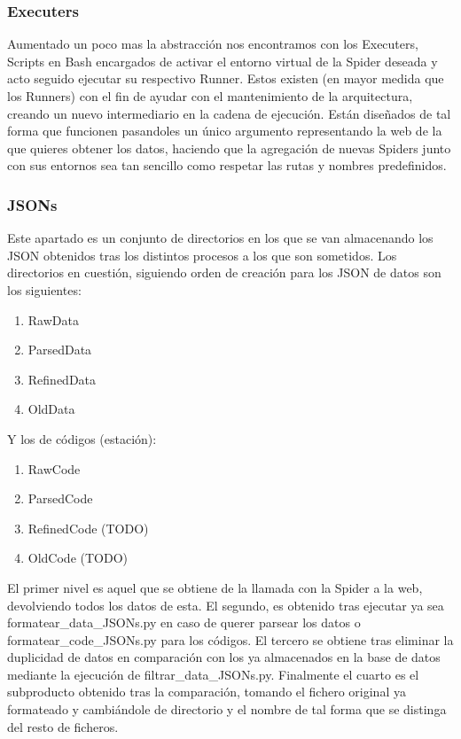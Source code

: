 \subsubsection{Executers}
Aumentado un poco mas la abstracción nos encontramos con los Executers, Scripts en Bash encargados de activar el entorno virtual de la Spider deseada y acto seguido ejecutar su respectivo Runner.\newline
\newline
Estos existen (en mayor medida que los Runners) con el fin de ayudar con el mantenimiento de la arquitectura, creando un nuevo intermediario en la cadena de ejecución.\newline
\newline
Están diseñados de tal forma que funcionen pasandoles un único argumento representando la web de la que quieres obtener los datos, haciendo que la agregación de nuevas Spiders junto con sus entornos sea tan sencillo como respetar las rutas y nombres predefinidos.

\subsubsection{JSONs}
Este apartado es un conjunto de directorios en los que se van almacenando los JSON obtenidos tras los distintos procesos a los que son sometidos.\newline
\newline
Los directorios en cuestión, siguiendo orden de creación para los JSON de datos son los siguientes:

\begin{enumerate}
	\item RawData
	\item ParsedData
	\item RefinedData
	\item OldData
\end{enumerate}
Y los de códigos (estación):
\begin{enumerate}
	\item RawCode
	\item ParsedCode
	\item RefinedCode (TODO)
	\item OldCode (TODO)
\end{enumerate}

El primer nivel es aquel que se obtiene de la llamada con la Spider a la web, devolviendo todos los datos de esta.\newline
\newline
El segundo, es obtenido tras ejecutar ya sea formatear\_data\_JSONs.py en caso de querer parsear los datos o formatear\_code\_JSONs.py para los códigos.\newline
\newline
El tercero se obtiene tras eliminar la duplicidad de datos en comparación con los ya almacenados en la base de datos mediante la ejecución de filtrar\_data\_JSONs.py.\newline
\newline
Finalmente el cuarto es el subproducto obtenido tras la comparación, tomando el fichero original ya formateado y cambiándole de directorio y el nombre de tal forma que se distinga del resto de ficheros.

